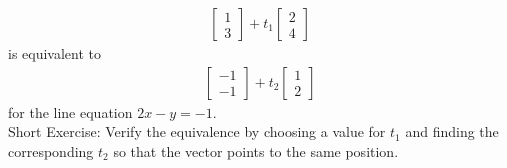 \begin{align*}
\begin{bmatrix}
1\\
3
\end{bmatrix}
+ t_1
\begin{bmatrix}
2 \\
4
\end{bmatrix}     
\end{align*}
is equivalent to
\begin{align*}
\begin{bmatrix}
-1\\
-1
\end{bmatrix}
+ t_2
\begin{bmatrix}
1 \\
2
\end{bmatrix}     
\end{align*}
for the line equation $2x - y = -1$.\\
Short Exercise: Verify the equivalence by choosing a value for $t_1$ and finding the corresponding $t_2$ so that the vector points to the same position.

